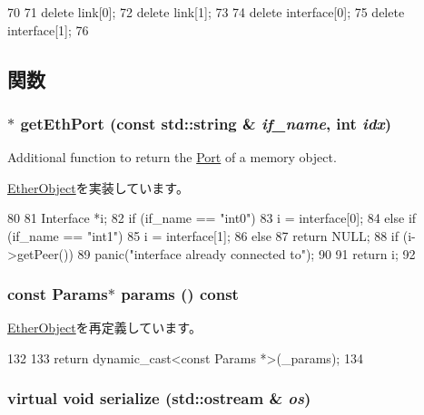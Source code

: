 \begin{DoxyCode}
70 {
71     delete link[0];
72     delete link[1];
73 
74     delete interface[0];
75     delete interface[1];
76 }
\end{DoxyCode}


\subsection{関数}
\hypertarget{classEtherLink_a10260c5a583c0894dcdcd1ced50a53ae}{
\subsubsection[{getEthPort}]{ $\ast$ getEthPort (const std::string \& {\em if\_\-name}, \/  int {\em idx})}}
\label{classEtherLink_a10260c5a583c0894dcdcd1ced50a53ae}
Additional function to return the \hyperlink{classPort}{Port} of a memory object. 

\hyperlink{classEtherObject_ac1aa24c1f8c0f1ee8bdc3f3d3799f67c}{EtherObject}を実装しています。


\begin{DoxyCode}
80 {
81     Interface *i;
82     if (if_name == "int0")
83         i = interface[0];
84     else if (if_name == "int1")
85         i = interface[1];
86     else
87         return NULL;
88     if (i->getPeer())
89         panic("interface already connected to\n");
90 
91     return i;
92 }
\end{DoxyCode}
\hypertarget{classEtherLink_acd3c3feb78ae7a8f88fe0f110a718dff}{
\subsubsection[{params}]{\setlength{\rightskip}{0pt plus 5cm}const {\bf Params}$\ast$ params () const}}
\label{classEtherLink_acd3c3feb78ae7a8f88fe0f110a718dff}


\hyperlink{classEtherObject_acd3c3feb78ae7a8f88fe0f110a718dff}{EtherObject}を再定義しています。


\begin{DoxyCode}
132     {
133         return dynamic_cast<const Params *>(_params);
134     }
\end{DoxyCode}
\hypertarget{classEtherLink_ad6272f80ae37e8331e3969b3f072a801}{
\subsubsection[{serialize}]{\setlength{\rightskip}{0pt plus 5cm}virtual void serialize (std::ostream \& {\em os})}}
\label{classEtherLink_ad6272f80ae37e8331e3969b3f072a801}


